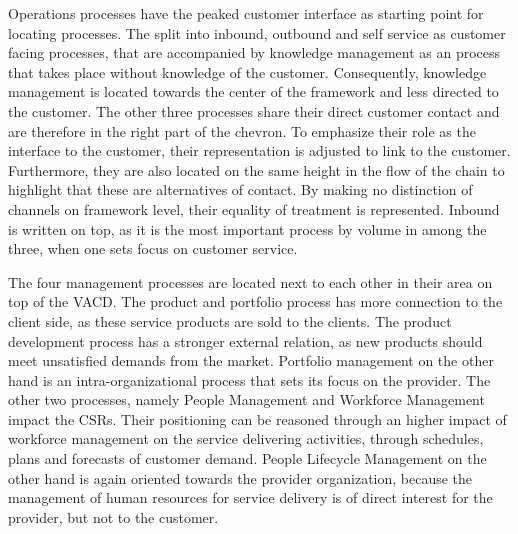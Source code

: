 	 Operations processes have the peaked customer interface as starting point for locating processes. The split into inbound, outbound and self service as customer facing processes, that are accompanied by knowledge management as an process that takes place without knowledge of the customer. Consequently, knowledge management is located towards the center of the framework and less directed to the customer. The other three processes share their direct customer contact and are therefore in the right part of the chevron. To emphasize their role as the interface to the customer, their representation is adjusted to link to the customer. Furthermore, they are also located on the same height in the flow of the chain to highlight that these are alternatives of contact. By making no distinction of channels on framework level, their equality of treatment is represented. Inbound is written on top, as it is the most important process by volume in among the three, when one sets focus on customer service.
	 
	 The four management processes are located next to each other in their area on top of the \acrshort{VACD}. The product and portfolio process has more connection to the client side, as these service products are sold to the clients. The product development process has a stronger external relation, as new products should meet unsatisfied demands from the market. Portfolio management on the other hand is an intra-organizational process that sets its focus on the provider. The other two processes, namely People  Management and Workforce Management impact the \acrshort{CSR}s. Their positioning can be reasoned through an higher impact of workforce management on the service delivering activities, through schedules, plans and forecasts of customer demand. People Lifecycle Management on the other hand is again oriented towards the provider organization, because the management of human resources for service delivery is of direct interest for the provider, but not to the customer.
	 
